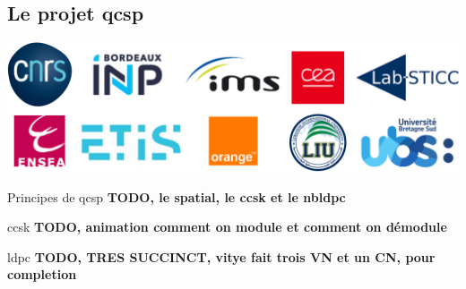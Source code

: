 \documentclass[../main.tex]{subfiles}
\begin{document}
\subsection[Le projet \acrshort{qcsp}]{Le projet \acrfull{qcsp}}

\begin{frame}{\subsecname}{}
  \begin{center}
    \includegraphics[width=0.6\linewidth]{figures/logos-thesis/partners-logos.png}
  \end{center}
\end{frame}

\begin{frame}{Principes de \acrshort{qcsp}}
  \textbf{TODO, le spatial, le ccsk et le nbldpc}
\end{frame}

\begin{frame}{\acrfull{ccsk}}
  \textbf{TODO, animation comment on module et comment on démodule}
\end{frame}

\begin{frame}{\acrfull{ldpc}}
  \textbf{TODO, TRES SUCCINCT, vitye fait trois VN et un CN, pour completion}
\end{frame}
\end{document}
